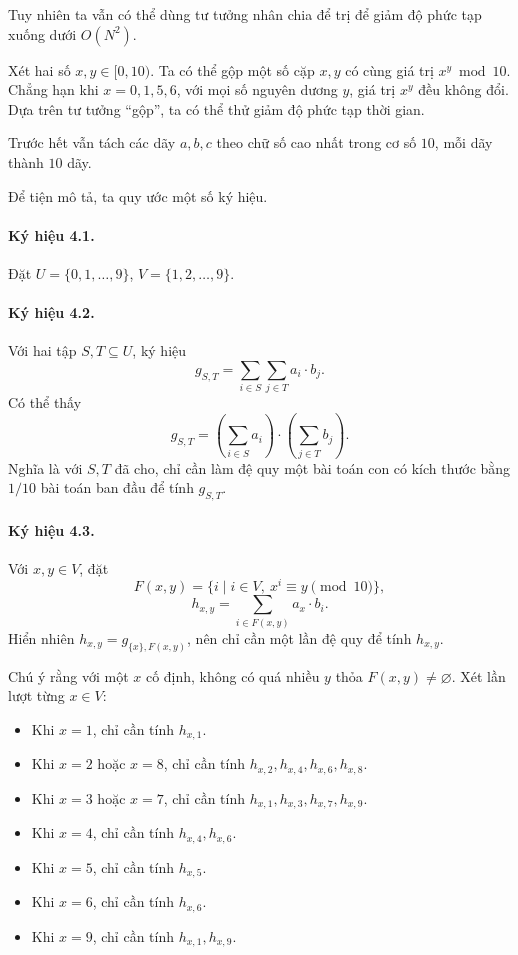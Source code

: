 \documentclass[11pt]{article}
\begin{document}
Tuy nhiên ta vẫn có thể dùng tư tưởng nhân chia để trị để giảm độ phức tạp
xuống dưới \(O(N^2)\).

Xét hai số \(x,y\in[0,10)\). Ta có thể gộp một số cặp \(x,y\) có cùng giá trị
\(x^y\bmod 10\). Chẳng hạn khi \(x=0,1,5,6\), với mọi số nguyên dương \(y\),
giá trị \(x^y\) đều không đổi. Dựa trên tư tưởng ``gộp'', ta có thể thử giảm độ
phức tạp thời gian.

Trước hết vẫn tách các dãy \(a,b,c\) theo chữ số cao nhất trong cơ số \(10\),
mỗi dãy thành \(10\) dãy.

Để tiện mô tả, ta quy ước một số ký hiệu.

\paragraph{Ký hiệu 4.1.}
Đặt \(U=\{0,1,\ldots,9\}\), \(V=\{1,2,\ldots,9\}\).

\paragraph{Ký hiệu 4.2.}
Với hai tập \(S,T\subseteq U\), ký hiệu
\[
  g_{S,T}=\sum_{i\in S}\sum_{j\in T}a_i\cdot b_j.
\]
Có thể thấy
\[
  g_{S,T}=\left(\sum_{i\in S}a_i\right)\cdot
          \left(\sum_{j\in T}b_j\right).
\]
Nghĩa là với \(S,T\) đã cho, chỉ cần làm đệ quy một bài toán con có kích thước
bằng \(1/10\) bài toán ban đầu để tính \(g_{S,T}\).

\paragraph{Ký hiệu 4.3.}
Với \(x,y\in V\), đặt
\[
  F(x,y)=\{i\mid i\in V,\ x^i\equiv y\pmod {10}\},
\]
\[
  h_{x,y}=\sum_{i\in F(x,y)}a_x\cdot b_i.
\]
Hiển nhiên \(h_{x,y}=g_{\{x\},F(x,y)}\), nên chỉ cần một lần đệ quy để tính
\(h_{x,y}\).

Chú ý rằng với một \(x\) cố định, không có quá nhiều \(y\) thỏa
\(F(x,y)\ne\varnothing\). Xét lần lượt từng \(x\in V\):
\begin{itemize}
  \item Khi \(x=1\), chỉ cần tính \(h_{x,1}\).
  \item Khi \(x=2\) hoặc \(x=8\), chỉ cần tính \(h_{x,2},h_{x,4},h_{x,6},h_{x,8}\).
  \item Khi \(x=3\) hoặc \(x=7\), chỉ cần tính \(h_{x,1},h_{x,3},h_{x,7},h_{x,9}\).
  \item Khi \(x=4\), chỉ cần tính \(h_{x,4},h_{x,6}\).
  \item Khi \(x=5\), chỉ cần tính \(h_{x,5}\).
  \item Khi \(x=6\), chỉ cần tính \(h_{x,6}\).
  \item Khi \(x=9\), chỉ cần tính \(h_{x,1},h_{x,9}\).
\end{itemize}
\end{document}
